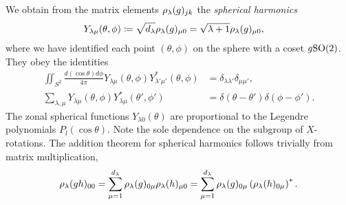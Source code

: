 We obtain from the matrix elements $\rho_{\lambda}(g)_{jk}$ the \emph{spherical harmonics}
\begin{align}
	Y_{\lambda \mu}(\theta,\phi) &\coloneqq
	\sqrt{d_{\lambda}} \rho_{\lambda}(g)_{\mu 0}
	= \sqrt{\lambda + 1} \rho_{\lambda}(g)_{\mu 0},
\end{align}
where we have identified each point $(\theta,\phi)$ on the sphere with a coset $g\text{SO}(2)$. They obey the identities
\begin{align}
\iint_{S^2} \frac{d(\cos \theta) d\phi}{4\pi} Y_{\lambda \mu}(\theta,\phi) Y^*_{\lambda' \mu'}(\theta,\phi) &= \delta_{\lambda\lambda'} \delta_{\mu\mu'}, \\
\sum_{\lambda,\mu} Y_{\lambda \mu}(\theta,\phi) Y^*_{\lambda \mu}(\theta',\phi')
&= \delta(\theta-\theta') \delta(\phi - \phi').
\end{align}
The zonal spherical functions $Y_{\lambda 0}(\theta)$ are proportional to the Legendre polynomials $P_l (\cos \theta)$. Note the sole dependence on the subgroup of $X$-rotations. The addition theorem for spherical harmonics follows trivially from matrix multiplication,
\begin{align}
\rho_{\lambda}(gh)_{00} = \sum_{\mu=1}^{d_{\lambda}} \rho_{\lambda}(g)_{0\mu} \rho_{\lambda}(h)_{\mu 0} = \sum_{\mu=1}^{d_{\lambda}} \rho_{\lambda}(g)_{0\mu} \left( \rho_{\lambda}(h)_{0 \mu} \right)^*.
\end{align}
